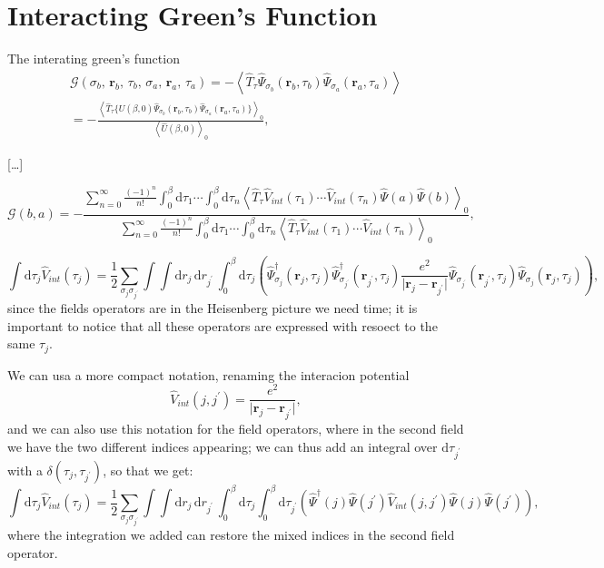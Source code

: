 \section{Interacting Green's Function}

The interating green's function
\[
    \begin{aligned}
        \mathcal{G}(\sigma_b,\, \mathbf{r}_b,\, \tau_b,\, \sigma_a,\, \mathbf{r}_a,\, \tau_a) = - \left\langle \hat{T}_{\tau} \hat{\Psi}_{\sigma_b}(\mathbf{r}_b, \tau_b) \hat{\Psi}_{\sigma_a}(\mathbf{r}_a, \tau_a) \right\rangle \\
        = - \frac{\left\langle \hat{T}_{\tau} \{\hat{U}(\beta, 0)\hat{\Psi}_{\sigma_b}(\mathbf{r}_b, \tau_b) \hat{\Psi}_{\sigma_a}(\mathbf{r}_a, \tau_a)\} \right\rangle_0}{\left\langle \hat{U}(\beta, 0) \right\rangle_0},
    \end{aligned}
\]

[\dots]

\[
    \mathcal{G}(b,a) = - \frac{\sum_{n=0}^{\infty} \frac{(-1)^n}{n!} \int_0^{\beta} \mathrm{d} \tau_1 \cdots \int_0^{\beta} \mathrm{d} \tau_n \left\langle \hat{T}_{\tau} \hat{V}_{int}(\tau_1)\cdots\hat{V}_{int}(\tau_n) \hat{\Psi}(a)\hat{\Psi}(b)\right\rangle_0}{\sum_{n=0}^{\infty} \frac{(-1)^n}{n!} \int_0^{\beta} \mathrm{d} \tau_1 \cdots \int_0^{\beta} \mathrm{d} \tau_n \left\langle \hat{T}_{\tau} \hat{V}_{int}(\tau_1)\cdots\hat{V}_{int}(\tau_n)\right\rangle_0},
\]

\[
    \int \mathrm{d} \tau_j \hat{V}_{int}(\tau_j) = \frac{1}{2} \sum_{\sigma_j \sigma_{j^{\prime}}} \int \int \mathrm{d} r_j \, \mathrm{d} r_{j^{\prime}} \, \int_0^{\beta} \mathrm{d} \tau_j \left( \hat{\Psi}^\dagger_{\sigma_j}(\mathbf{r}_j, \tau_j) \hat{\Psi}^\dagger_{\sigma_{j^{\prime}}}(\mathbf{r}_{j^{\prime}}, \tau_j) \frac{e^2}{\vert \mathbf{r}_j - \mathbf{r}_{j^{\prime}} \vert}\hat{\Psi}_{\sigma_{j^{\prime}}}(\mathbf{r}_{j^{\prime}}, \tau_j) \hat{\Psi}_{\sigma_j}(\mathbf{r}_j, \tau_j) \right),
\]
since the fields operators are in the Heisenberg picture we need time; it is important to notice that all these operators are expressed with resoect to the same \(\tau_j\).

We can usa a more compact notation, renaming the interacion potential
\[
    \hat{V}_{int} (j,j^{\prime}) = \frac{e^2}{\vert \mathbf{r}_j - \mathbf{r}_{j^{\prime}}\vert},
\]
and we can also use this notation for the field operators, where in the second field we have the two different indices appearing; we can thus add an integral over \(\mathrm{d} \tau_{j^{\prime}}\) with a \(\delta(\tau_j, \tau_{j^{\prime} })\), so that we get:
\[
    \int \mathrm{d} \tau_j \hat{V}_{int}(\tau_j) = \frac{1}{2} \sum_{\sigma_j \sigma_{j^{\prime}}} \int \int \mathrm{d} r_j \, \mathrm{d} r_{j^{\prime}} \, \int_0^{\beta} \mathrm{d} \tau_j \int_0^{\beta} \mathrm{d} \tau_{j^{\prime}} \left( \hat{\Psi}^\dagger(j) \hat{\Psi}(j^{\prime}) \hat{V}_{int} (j,j^{\prime}) \hat{\Psi}(j) \hat{\Psi}(j^{\prime}) \right),
\]
where the integration we added can restore the mixed indices in the second field operator.

